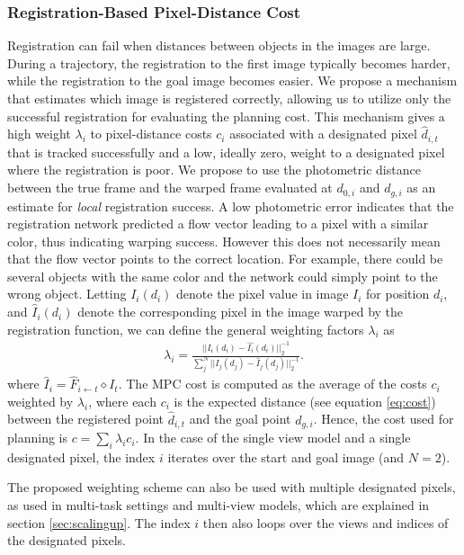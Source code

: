 \subsubsection{Registration-Based Pixel-Distance Cost}
\label{subsec:planning_costs}

Registration can fail when distances between objects in the images are large. During a trajectory, the registration to the first image typically becomes harder, while the registration to the goal image becomes easier. We propose a mechanism that estimates which image is registered correctly, allowing us to utilize only the successful registration for evaluating the planning cost. This mechanism gives a high weight $\lambda_i$ to pixel-distance costs $c_i$ associated with a designated pixel $\hat{d}_{i,t}$ that is tracked successfully and a low, ideally zero, weight to a designated pixel where the registration is poor. We propose to use the photometric distance between the true frame and the warped frame evaluated at $d_{0,i}$ and $d_{g,i}$ as an estimate for \emph{local} registration success. A low photometric error indicates that the registration network predicted a flow vector leading to a pixel with a similar color, thus indicating warping success. However this does not necessarily mean that the flow vector points to the correct location. For example, there could be several objects with the same color and the network could simply point to the wrong object. Letting $I_i(d_i)$ denote the pixel value in image $I_i$ for position $d_i$, and $\hat{I}_i(d_i)$ denote the corresponding pixel in the image warped by the registration function, we can define the general weighting factors $\lambda_i$ as
\begin{align}
\lambda_i =  \frac{||I_i(d_i) - \hat{I_i}(d_i)||_2^{-1}}{\sum^N_j ||I_j(d_j) - \hat{I}_j(d_j)||^{-1}_2}.
\label{eqn:cost_avg}
\end{align}
where $\hat{I}_i = \hat{F}_{i \leftarrow t} \diamond I_t$. The MPC cost is computed as the average of the costs $c_i$ weighted by $\lambda_i$, where each $c_i$ is the expected distance (see equation \ref{eq:cost}) between the registered point $\hat{d}_{i,t}$ and the goal point $d_{g,i}$. Hence, the cost used for planning is $c = \sum_i \lambda_i c_i$.  In the case of the single view model and a single designated pixel, the index $i$ iterates over the start and goal image (and $N=2$).

The proposed weighting scheme can also be used with multiple designated pixels, as used in multi-task settings and multi-view models, which are explained in section \ref{sec:scalingup}. The index $i$ then also loops over the views and indices of the designated pixels.

